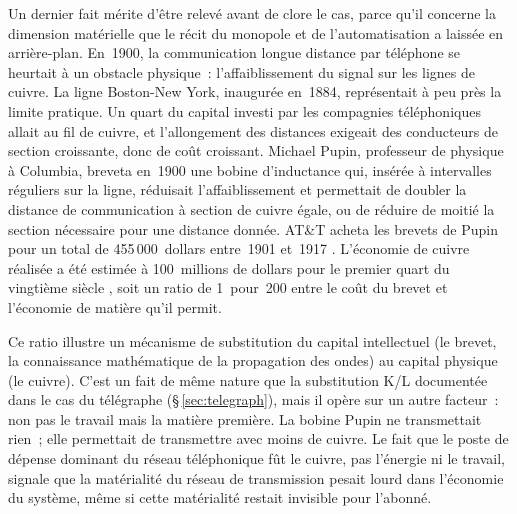 %
Un dernier fait mérite d'être relevé avant de clore le cas, parce qu'il concerne la dimension matérielle que le récit du monopole et de l'automatisation a laissée en arrière-plan. En~1900, la communication longue distance par téléphone se heurtait à un obstacle physique~: l'affaiblissement du signal sur les lignes de cuivre. La ligne Boston-New York, inaugurée en~1884, représentait à peu près la limite pratique. Un quart du capital investi par les compagnies téléphoniques allait au fil de cuivre, et l'allongement des distances exigeait des conducteurs de section croissante, donc de coût croissant. Michael Pupin, professeur de physique à Columbia, breveta en~1900 une bobine d'inductance qui, insérée à intervalles réguliers sur la ligne, réduisait l'affaiblissement et permettait de doubler la distance de communication à section de cuivre égale, ou de réduire de moitié la section nécessaire pour une distance donnée. AT\&T acheta les brevets de Pupin pour un total de 455\,000~dollars entre~1901 et~1917 \parencite{brittain_turning_1970}. L'économie de cuivre réalisée a été estimée à 100~millions de dollars pour le premier quart du vingtième siècle \parencite{brittain_turning_1970}, soit un ratio de 1~pour~200 entre le coût du brevet et l'économie de matière qu'il permit.

Ce ratio illustre un mécanisme de substitution du capital intellectuel (le brevet, la connaissance mathématique de la propagation des ondes) au capital physique (le cuivre). C'est un fait de même nature que la substitution K/L documentée dans le cas du télégraphe (§\,\ref{sec:telegraph}), mais il opère sur un autre facteur~: non pas le travail mais la matière première. La bobine Pupin ne transmettait rien~; elle permettait de transmettre avec moins de cuivre. Le fait que le poste de dépense dominant du réseau téléphonique fût le cuivre, pas l'énergie ni le travail, signale que la matérialité du réseau de transmission pesait lourd dans l'économie du système, même si cette matérialité restait invisible pour l'abonné.


